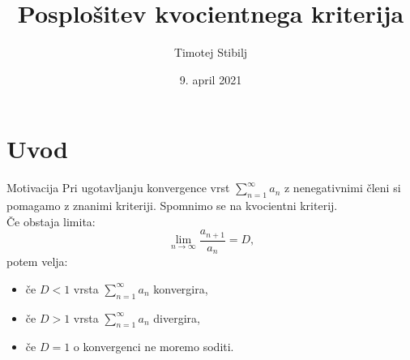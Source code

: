 \documentclass{beamer}
\begin{document}
\title{Posplošitev kvocientnega kriterija}
\author{Timotej Stibilj}
\date{9. april 2021}

\begin{frame}
   \titlepage
\end{frame}
\section{Uvod}
\begin{frame}
    \begin{block}{Motivacija}
    Pri ugotavljanju konvergence vrst $\sum_{n = 1}^{\infty}{a_n}$ z nenegativnimi členi si pomagamo z znanimi kriteriji.
    Spomnimo se na kvocientni kriterij. \\
    \pause
    Če obstaja limita:
    \[
       \lim_{n \to \infty} \frac{a_{n + 1}}{a_n} = D \text{,}
    \]
    potem velja: \\
         \begin{itemize}
             \item če $ D < 1 $ vrsta $\sum_{n = 1}^{\infty}{a_n}$ konvergira,
             \item če $ D > 1$ vrsta $\sum_{n = 1}^{\infty}{a_n}$ divergira,
             \item če $ D = 1$ o konvergenci ne moremo soditi.
         \end{itemize}
   
    \end{block}
\end{frame}
\end{document}
